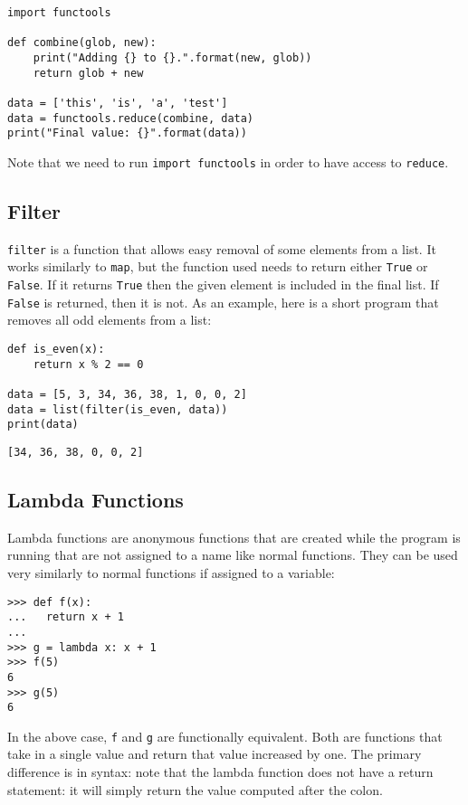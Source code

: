 \documentclass[11pt]{cselabheader}
\begin{document}
\begin{lstlisting}[style=python]
import functools

def combine(glob, new):
    print("Adding {} to {}.".format(new, glob))
    return glob + new

data = ['this', 'is', 'a', 'test']
data = functools.reduce(combine, data)
print("Final value: {}".format(data))
\end{lstlisting}

Note that we need to run \lstinline{import functools} in order to have access to \lstinline{reduce}.

\subsection{Filter}
\label{subsec:filter}
\lstinline{filter} is a function that allows easy removal of some elements from a list. It works similarly to \lstinline{map}, but the function used needs to return either \lstinline{True} or \lstinline{False}. If it returns \lstinline{True} then the given element is included in the final list. If \lstinline{False} is returned, then it is not. As an example, here is a short program that removes all odd elements from a list:

\begin{lstlisting}[style=python]
def is_even(x):
    return x % 2 == 0

data = [5, 3, 34, 36, 38, 1, 0, 0, 2]
data = list(filter(is_even, data))
print(data)
\end{lstlisting}

\begin{lstlisting}[style=bash]
[34, 36, 38, 0, 0, 2]
\end{lstlisting}

\subsection{Lambda Functions}
\label{subsec:lambda}
Lambda functions are anonymous functions that are created while the program is running that are not assigned to a name like normal functions. They can be used very similarly to normal functions if assigned to a variable:

\begin{lstlisting}[style=ipython]
>>> def f(x):
...   return x + 1
... 
>>> g = lambda x: x + 1
>>> f(5)
6
>>> g(5)
6
\end{lstlisting}

In the above case, \lstinline{f} and \lstinline{g} are functionally equivalent. Both are functions that take in a single value and return that value increased by one. The primary difference is in syntax: note that the lambda function does not have a return statement: it will simply return the value computed after the colon.
\end{document}
